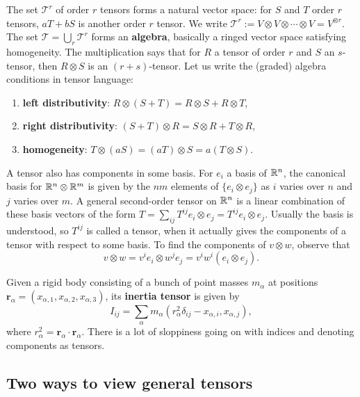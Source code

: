 The set $\mathcal{T} ^r$ of order $r$ tensors forms a natural vector space: for $S$ and $T$ order $r$ tensors, $aT+bS$ is another order $r$ tensor. We write $\mathcal{T} ^r := V\otimes V \otimes \cdots \otimes V=V^{\otimes r}$. The set $\mathcal{T} =\bigcup_{r} \mathcal{T} ^r$ forms an \textbf{algebra}, basically a ringed vector space satisfying homogeneity. The multiplication says that for $R $ a tensor of order $r$ and $S$ an $s$-tensor, then $R\otimes S$ is an $(r+s)$-tensor. Let us write the (graded) algebra conditions in tensor language:
\begin{enumerate}[label=(\arabic*)]
    \setlength\itemsep{-.2em}
\item \textbf{left distributivity}: $R\otimes (S+T)=R\otimes S+R\otimes T$,
\item \textbf{right distributivity}: $(S+T)\otimes R=S\otimes R+T\otimes R$,
\item \textbf{homogeneity}: $T\otimes (aS)=(aT)\otimes S=a(T\otimes S)$.
\end{enumerate} A tensor also has components in some basis. For $e_i $ a basis of $\mathbb{R}^n $, the canonical basis for $\mathbb{R}^n \otimes \mathbb{R}^m $ is given by the $nm$ elements of $\{e_i \otimes e_j \} $ as $i$ varies over $n$ and $j$ varies over $m$. A general second-order tensor on $\mathbb{R}^n $ is a linear combination of these basis vectors of the form $T=\sum _{ij}T^{ij}e_i \otimes e_j =T^{ij}e_i \otimes e_j $. Usually the basis is understood, so $T^{ij}$ is called a tensor, when it actually gives the components of a tensor with respect to some basis. To find the components of $v\otimes w$, observe that \[
v\otimes w=v^i e_i \otimes w^j e_j =v^i w^i (e_i\otimes e_j ).
\] 
\begin{example}
    Given a rigid body consisting of a bunch of point masses $m_{\alpha }$ at positions $\mathbf r_{\alpha }=(x_{\alpha ,1},x_{\alpha ,2},x_{\alpha ,3})$, its \textbf{inertia tensor} is given by \[
        I_{ij}=\sum _{\alpha }m_{\alpha }(r^2_{\alpha }\delta_{ij}-x_{\alpha ,i},x_{\alpha ,j}),
    \] where $r^2_{\alpha }=\mathbf r_{\alpha }\cdot \mathbf r_{\alpha }$. There is a lot of sloppiness going on with indices and denoting components as tensors.
\end{example}
\subsection{Two ways to view general tensors}
